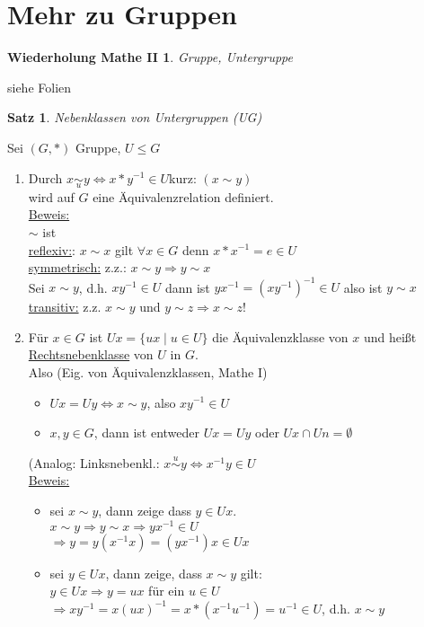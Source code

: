 \documentclass[a4paper,11pt]{article}
\newtheorem{satz}[definition]{Satz}
\newtheorem{wdh}[definition]{Wiederholung Mathe II}
\newcommand{\hsp}{\hspace{5mm}}
\begin{document}
\newpage

\section{Mehr zu Gruppen}
\begin{wdh}
	Gruppe, Untergruppe
\end{wdh}
siehe Folien

\begin{satz}
	Nebenklassen von Untergruppen (UG)
\end{satz}

Sei $(G,*)$ Gruppe, $U\leq G$
\begin{enumerate}[label=\alph*)]
	\item Durch $x\underset{u}{\sim}y\Leftrightarrow x*y^{-1}\in U$\hsp kurz: $(x\sim y)$ \\
	wird auf $G$ eine Äquivalenzrelation definiert. \\
	\underline{Beweis:} \\
	$\sim$ ist \\
	\underline{reflexiv:}: $x\sim x$ gilt $\forall x\in G$ denn $x*x^{-1}=e\in U$ \\
	\underline{symmetrisch:} z.z.: $x\sim y\Rightarrow y\sim x$ \\
	Sei $x\sim y$, d.h. $xy^{-1}\in U$ dann ist $yx^{-1}=(xy^{-1})^{-1}\in U$ also ist $y\sim x$ \\
	\underline{transitiv:} z.z. $x\sim y$ und $y\sim z\Rightarrow x\sim z$!
	\item Für $x\in G$ ist $Ux=\{ux\mid u\in U\}$ die Äquivalenzklasse von $x$ und heißt \underline{Rechtsnebenklasse} von $U$ in $G$. \\
	Also (Eig. von Äquivalenzklassen, Mathe I) \\
	\vspace{-6mm}
	\begin{itemize}
		\item $Ux=Uy\Leftrightarrow x\sim y$, also $xy^{-1}\in U$
		\item $x,y\in G$, dann ist entweder $Ux=Uy$ oder $Ux\cap Un=\emptyset$
	\end{itemize}
	(Analog: Linksnebenkl.: $x\overset{u}{\sim}y\Leftrightarrow x^{-1}y\in U$ \\
	\underline{Beweis:} \\
	\vspace{-6mm}
	\begin{itemize}
		\item sei $x\sim y$, dann zeige dass $y\in Ux$. \\
		$x\sim y\Rightarrow y\sim x\Rightarrow yx^{-1}\in U$ \\
		$\Rightarrow y=y(x^{-1}x)=(yx^{-1})x\in Ux$ \\
		\item sei $y\in Ux$, dann zeige, dass $x\sim y$ gilt: \\
		$y\in Ux\Rightarrow y=ux$ für ein $u\in U$ \\
		$\Rightarrow xy^{-1}=x(ux)^{-1}=x*(x^{-1}u^{-1})=u^{-1}\in U$, d.h. $x\sim y$
	\end{itemize}
\end{enumerate}
\end{document}
